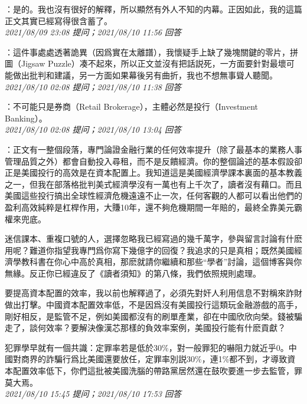 \documentclass[twocolumn]{ctexart}
\begin{document}
：是的。我也沒有很好的解釋，所以顯然有外人不知的内幕。正因如此，我的這篇正文其實已經寫得很含蓄了。
\\

\textit{\hfill\noindent\small 2021/08/09 23:08 提问；2021/08/10 11:56 回答}

：這件事處處透著詭異（因爲實在太離譜），我懷疑手上缺了幾塊關鍵的零片，拼圖（Jigsaw Puzzle）凑不起來，所以正文並沒有把話説死，一方面要針對最壞可能做出批判和建議，另一方面如果幕後另有曲折，我也不想無事聳人聽聞。
\\

\textit{\hfill\noindent\small 2021/08/10 02:08 提问；2021/08/10 11:38 回答}

：不可能只是券商（Retail Brokerage），主體必然是投行（Investment Banking）。
\\

\textit{\hfill\noindent\small 2021/08/10 02:08 提问；2021/08/10 13:04 回答}

：正文有一整個段落，專門論證金融行業的任何效率提升（除了最基本的業務人事管理品質之外）都會自動投入尋租，而不是反饋經濟。你的整個論述的基本假設卻正是美國投行的高效是在資本配置上。我知道這是美國經濟學課本裏面的基本教義之一，但我在部落格批判美式經濟學沒有一萬也有上千次了，讀者沒有藉口。而且美國這些投行搞出全球性經濟危機遠遠不止一次，任何客觀的人都可以看出他們的盈利高效純粹是杠桿作用，大賺10年，還不夠危機期間一年賠的，最終全靠美元霸權來兜底。

迷信課本、重複口號的人，選擇忽略我已經寫過的幾千萬字，參與留言討論有什麽用呢？難道你指望我專門爲你寫下幾億字的回復？我追求的只是真相；既然美國經濟學教科書在你心中高於真相，那麽就請你繼續和那些“學者”討論，這個博客與你無緣。反正你已經違反了《讀者須知》的第八條，我們依照規則處理。


要提高資本配置的效率，我以前也解釋過了，必須先對奸人利用信息不對稱來詐財做出打擊。中國資本配置效率低，不是因爲沒有美國投行這類玩金融游戲的高手，剛好相反，是監管不足，例如美國都沒有的刷單產業，卻在中國欣欣向榮。錢被騙走了，談何效率？要解決像漢芯那樣的負效率案例，美國投行能有什麽貢獻？

犯罪學早就有一個共識：定罪率若是低於30\%，對一般罪犯的嚇阻力就近乎0。中國對商界的詐騙行爲比美國還要放任，定罪率別説30\%，連1\%都不到，才導致資本配置效率低下，你們這批被美國洗腦的帶路黨居然還在鼓吹要進一步去監管，罪莫大焉。
\\

\textit{\hfill\noindent\small 2021/08/10 15:45 提问；2021/08/10 17:53 回答}
\end{document}
